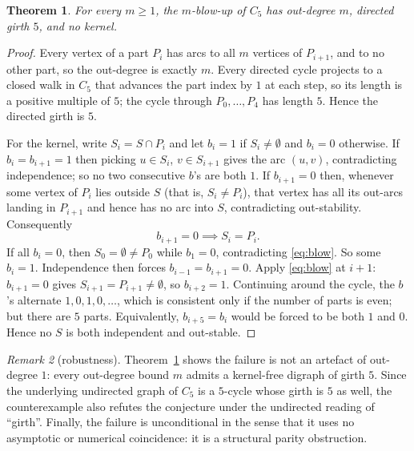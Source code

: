 \documentclass[11pt]{article}
\newtheorem{theorem}{Theorem}
\theoremstyle{definition}
\theoremstyle{remark}
\newtheorem{remark}[theorem]{Remark}
\newcommand{\Cfive}{C_5}
\begin{document}
\begin{theorem}\label{thm:blowup}
For every $m \ge 1$, the $m$-blow-up of $\Cfive$ has out-degree $m$, directed
girth $5$, and no kernel.
\end{theorem}

\begin{proof}
Every vertex of a part $P_i$ has arcs to all $m$ vertices of $P_{i+1}$, and to no
other part, so the out-degree is exactly $m$. Every directed cycle projects to a
closed walk in $\Cfive$ that advances the part index by $1$ at each step, so its
length is a positive multiple of $5$; the cycle through $P_0, \dots, P_4$ has
length $5$. Hence the directed girth is $5$.

For the kernel, write $S_i = S \cap P_i$ and let $b_i = 1$ if $S_i \ne
\emptyset$ and $b_i = 0$ otherwise. If $b_i = b_{i+1} = 1$ then picking $u \in
S_i$, $v \in S_{i+1}$ gives the arc $(u, v)$, contradicting independence; so no
two consecutive $b$'s are both $1$. If $b_{i+1} = 0$ then, whenever some vertex
of $P_i$ lies outside $S$ (that is, $S_i \ne P_i$), that vertex has all its
out-arcs landing in $P_{i+1}$ and hence has no arc into $S$, contradicting
out-stability. Consequently
\begin{equation}\label{eq:blow}
b_{i+1} = 0 \implies S_i = P_i .
\end{equation}
If all $b_i = 0$, then $S_0 = \emptyset \ne P_0$ while $b_1 = 0$, contradicting
\eqref{eq:blow}. So some $b_i = 1$. Independence then forces $b_{i-1} = b_{i+1}
= 0$. Apply \eqref{eq:blow} at $i+1$: $b_{i+1} = 0$ gives $S_{i+1} = P_{i+1}
\neq \emptyset$, so $b_{i+2} = 1$. Continuing around the cycle, the $b$'s
alternate $1, 0, 1, 0, \dots$, which is consistent only if the number of parts
is even; but there are $5$ parts. Equivalently, $b_{i+5} = b_i$ would be forced
to be both $1$ and $0$. Hence no $S$ is both independent and out-stable.
\end{proof}

\begin{remark}[robustness]
Theorem~\ref{thm:blowup} shows the failure is not an artefact of out-degree $1$:
every out-degree bound $m$ admits a kernel-free digraph of girth $5$. Since the
underlying undirected graph of $\Cfive$ is a $5$-cycle whose girth is $5$ as
well, the counterexample also refutes the conjecture under the undirected
reading of ``girth''. Finally, the failure is unconditional in the sense that it
uses no asymptotic or numerical coincidence: it is a structural parity
obstruction.
\end{remark}
\end{document}
